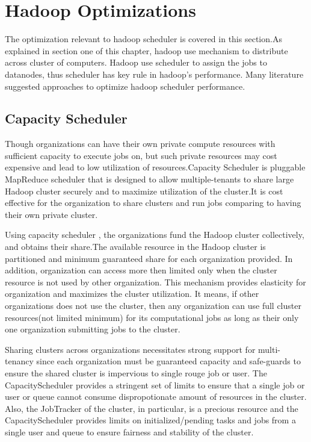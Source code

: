 

\section{Hadoop Optimizations}

 The optimization relevant to hadoop scheduler is covered in this section.As explained in section one of this chapter, hadoop use mechanism to distribute across cluster of computers. Hadoop use scheduler to assign the jobs to datanodes, thus scheduler has key rule in hadoop's performance.  Many literature suggested approaches to optimize hadoop scheduler performance.
 
 \subsection{Capacity Scheduler}
 
Though organizations can have their own private compute resources with sufficient capacity to execute jobs on, but such private resources may cost expensive and lead to low utilization of resources.Capacity Scheduler is pluggable MapReduce scheduler that is designed to allow multiple-tenants to share large Hadoop cluster securely and to maximize utilization of the cluster.It is cost effective for the organization to share clusters and run jobs comparing to having their own private cluster. 

 Using capacity scheduler , the organizations fund the Hadoop cluster collectively, and obtains their share.The available resource in the Hadoop cluster is partitioned and  minimum guaranteed share for each organization provided. In addition, organization can access more then limited only when the cluster resource is not used by other organization. This mechanism provides elasticity for organization and maximizes the cluster utilization. It means, if other organizations does not use the cluster, then any organization can use full cluster resources(not limited minimum) for its computational jobs as long as their only one organization submitting jobs to the cluster. 
 
 
 
 
 
 Sharing clusters across organizations necessitates strong support for multi-tenancy since
each organization must be guaranteed capacity and safe-guards to ensure the shared cluster
is impervious to single rouge job or user. The CapacityScheduler provides a stringent set of
limits to ensure that a single job or user or queue cannot consume dispropotionate amount
of resources in the cluster. Also, the JobTracker of the cluster, in particular, is a precious
resource and the CapacityScheduler provides limits on initialized/pending tasks and jobs
from a single user and queue to ensure fairness and stability of the cluster.

